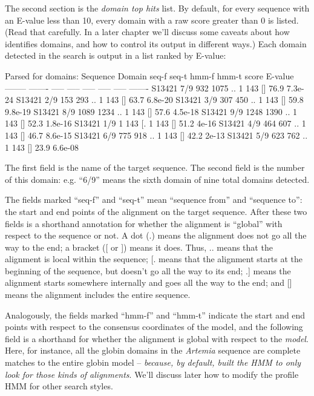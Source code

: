The second section is the \emph{ domain top hits} list. By default, for
every sequence with an E-value less than 10, every domain with a raw
score greater than 0 is listed. (Read that carefully. In a later
chapter we'll discuss some caveats about how 
identifies domains, and how to control its output in different ways.)
Each domain detected in the search is output in a list ranked by
E-value:

\begin{sreoutput}
Parsed for domains:
Sequence Domain  seq-f seq-t    hmm-f hmm-t      score  E-value
-------- ------- ----- -----    ----- -----      -----  -------
S13421     7/9     932  1075 ..     1   143 []    76.9  7.3e-24
S13421     2/9     153   293 ..     1   143 []    63.7  6.8e-20
S13421     3/9     307   450 ..     1   143 []    59.8  9.8e-19
S13421     8/9    1089  1234 ..     1   143 []    57.6  4.5e-18
S13421     9/9    1248  1390 ..     1   143 []    52.3  1.8e-16
S13421     1/9       1   143 [.     1   143 []    51.2    4e-16
S13421     4/9     464   607 ..     1   143 []    46.7  8.6e-15
S13421     6/9     775   918 ..     1   143 []    42.2    2e-13
S13421     5/9     623   762 ..     1   143 []    23.9  6.6e-08
\end{sreoutput}

The first field is the name of the target sequence. The second field
is the number of this domain: e.g. ``6/9'' means the sixth domain of
nine total domains detected.

The fields marked ``seq-f'' and ``seq-t'' mean ``sequence from'' and
``sequence to'': the start and end points of the alignment on the
target sequence. After these two fields is a shorthand annotation for
whether the alignment is ``global'' with respect to the sequence or
not. A dot (.) means the alignment does not go all the way to the end;
a bracket ([ or ]) means it does. Thus, .. means that the alignment is
local within the sequence; [. means that the alignment starts at the
beginning of the sequence, but doesn't go all the way to its end; .]
means the alignment starts somewhere internally and goes all the way
to the end; and [] means the alignment includes the entire sequence.

Analogously, the fields marked ``hmm-f'' and ``hmm-t'' indicate the
start and end points with respect to the consensus coordinates of the
model, and the following field is a shorthand for whether the
alignment is global with respect to the \emph{model}. Here, for
instance, all the globin domains in the \emph{Artemia} sequence are
complete matches to the entire globin model -- \emph{because, by
default,  built the HMM to only look for those kinds of
alignments}. We'll discuss later how to modify the profile HMM for
other search styles.

